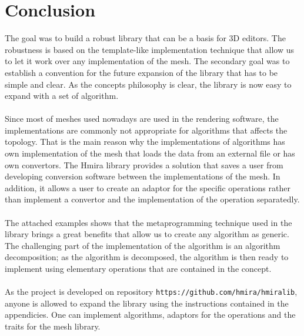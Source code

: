 \chapter*{Conclusion}

The goal was to build a robust library that can be a basis for 3D editors. The robustness
is based on the template-like implementation technique that allow us to let it work over
any implementation of the mesh. The secondary goal was to establish a convention
for the future expansion of the library that has to be simple and clear. As the
concepts philosophy is clear, the library is now easy to expand with a set of algorithm.\\
\\
Since most of meshes used nowadays are used in the rendering software, the implementations
are commonly not appropriate for algorithms that affects the topology. That is the main reason
why the implementations of algorithms has own implementation of the mesh that loads the
data from an external file or has own convertors. The Hmira library provides a 
solution that saves a user from developing conversion software between the implementations of the mesh.
In addition, it allows a user to create an adaptor for the specific operations
rather than implement a convertor and the implementation of the operation separatedly.\\
\\
The attached examples shows that the metaprogramming technique used in the library brings a great
benefits that allow us to create any algorithm as generic. The challenging part of the implementation
of the algorithm is an algorithm decomposition; as the algorithm is decomposed, the algorithm
is then ready to implement using elementary operations that are contained in the concept.\\
\\
As the project is developed on repository \texttt{https://github.com/hmira/hmiralib},
anyone is allowed to expand the library using the instructions contained in the appendicies.
One can implement algorithms, adaptors for the operations and the traits for the
mesh library.